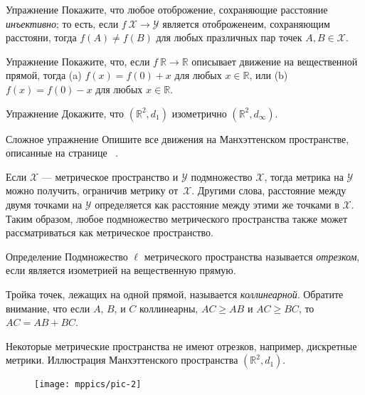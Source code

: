 \begin{thm}{Упражнение}\label{ex:dist-preserv=>injective}
Покажите, что любое отоброжение, сохраняющие расстояние \emph{инъективно};
то есть, если $f\:\mathcal X\to\mathcal Y$ является отоброженеим, сохраняющим расстояни, 
тогда $f(A)\ne f(B)$ для любых празличных пар точек $A, B\in \mathcal X$.
\end{thm}

\begin{thm}{Упражнение}\label{ex:motion-of-R}
Покажите, что, если $f\:\mathbb{R}\to\mathbb{R}$ описывает движение на вещественной прямой,
тогда (a)
$f(x)=f(0)+x$ для любых $x\in \mathbb{R}$, 
или (b)
$f(x)=f(0)-x$ для любых $x\in \mathbb{R}$. 

\end{thm}

\begin{thm}{Упражнение}\label{ex:d_1=d_infty}
Докажите, что $(\mathbb{R}^2,d_1)$ изометрично $(\mathbb{R}^2,d_\infty)$.
\end{thm}

\begin{thm}{Сложное упражнение}\label{ad-ex:motions of Manhattan plane}
Опишите все движения на Манхэттенском пространстве, описанные на странице ~\pageref{Manhattan plane}.
\end{thm}

Если $\mathcal X$ — метрическое пространство и $\mathcal Y$ подмножество $\mathcal X$,
тогда метрика на $\mathcal Y$ можно получить, ограничив метрику от~$\mathcal X$. 
Другими слова, 
расстояние между двумя точками на $\mathcal Y$ определяется как расстояние между этими же точками в $\mathcal X$.
Таким образом, любое подмножество метрического пространства также может рассматриваться как метрическое пространство. 

\begin{thm}{Определение}\label{def:line}
Подмножество $\ell$ метрического пространства называется \emph{отрезком}, если является изометрией на вещественную прямую.
\end{thm}

Тройка точек, лежащих на одной прямой, называется \emph{коллинеарной}.
Обратите внимание, что если $A$, $B$, и  $C$ коллинеарны, $AC\ge AB$ и $AC\ge BC$, то $AC= AB+BC$.

Некоторые метрические пространства не имеют отрезков, например, дискретные метрики.
Иллюстрация Манхэттенского пространства $(\mathbb{R}^2,d_1)$. 
\begin{figure}[h!]
\centering
\texttt{[image: mppics/pic-2]}
\end{figure}

